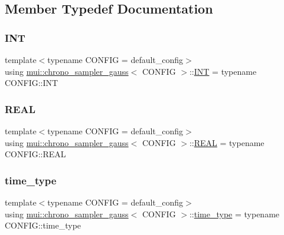 \subsection{Member Typedef Documentation}
\mbox{\label{classmui_1_1chrono__sampler__gauss_a86da50872efe4ac7b75234c463e716bf}} 
\subsubsection{\texorpdfstring{I\+NT}{INT}}
{\footnotesize\ttfamily template$<$typename C\+O\+N\+F\+IG  = default\+\_\+config$>$ \\
using \hyperlink{classmui_1_1chrono__sampler__gauss}{mui\+::chrono\+\_\+sampler\+\_\+gauss}$<$ C\+O\+N\+F\+IG $>$\+::\hyperlink{classmui_1_1chrono__sampler__gauss_a86da50872efe4ac7b75234c463e716bf}{I\+NT} =  typename C\+O\+N\+F\+I\+G\+::\+I\+NT}

\mbox{\label{classmui_1_1chrono__sampler__gauss_acb55ad8350ad77bd80ea3979bc01f7a5}} 
\subsubsection{\texorpdfstring{R\+E\+AL}{REAL}}
{\footnotesize\ttfamily template$<$typename C\+O\+N\+F\+IG  = default\+\_\+config$>$ \\
using \hyperlink{classmui_1_1chrono__sampler__gauss}{mui\+::chrono\+\_\+sampler\+\_\+gauss}$<$ C\+O\+N\+F\+IG $>$\+::\hyperlink{classmui_1_1chrono__sampler__gauss_acb55ad8350ad77bd80ea3979bc01f7a5}{R\+E\+AL} =  typename C\+O\+N\+F\+I\+G\+::\+R\+E\+AL}

\mbox{\label{classmui_1_1chrono__sampler__gauss_accb8778472734fd419da15b26e087a41}} 
\subsubsection{\texorpdfstring{time\+\_\+type}{time\_type}}
{\footnotesize\ttfamily template$<$typename C\+O\+N\+F\+IG  = default\+\_\+config$>$ \\
using \hyperlink{classmui_1_1chrono__sampler__gauss}{mui\+::chrono\+\_\+sampler\+\_\+gauss}$<$ C\+O\+N\+F\+IG $>$\+::\hyperlink{classmui_1_1chrono__sampler__gauss_accb8778472734fd419da15b26e087a41}{time\+\_\+type} =  typename C\+O\+N\+F\+I\+G\+::time\+\_\+type}



